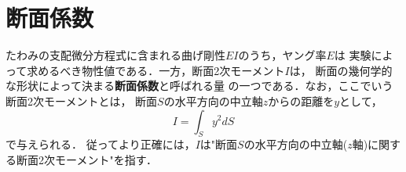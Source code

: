 ﻿\documentclass[10pt,a4j]{jbook}
\newlength{\minitwocolumn}
\begin{document}
\newcommand{\fat}[1]{\mbox{\boldmath $#1$}}
\newcommand{\D}{\partial}
\newcommand{\w}{\omega}
\newcommand{\ga}{\alpha}
\newcommand{\gb}{\beta}
\newcommand{\gx}{\xi}
\newcommand{\gz}{\zeta}
\newcommand{\vhat}[1]{\hat{\fat{#1}}}
\newcommand{\spc}{\vspace{0.7\baselineskip}}
\newcommand{\halfspc}{\vspace{0.3\baselineskip}}

\newcommand{\twofig}[2]
 {
   \begin{figure}
     \begin{minipage}[t]{\minitwocolumn}
         \begin{center}   #1
         \end{center}
     \end{minipage}
         \hspace{\columnsep}
     \begin{minipage}[t]{\minitwocolumn}
         \begin{center} #2
         \end{center}
     \end{minipage}
   \end{figure}
 }
\setcounter{chapter}{7}
\chapter{断面係数}
たわみの支配微分方程式に含まれる曲げ剛性$EI$のうち，ヤング率$E$は
実験によって求めるべき物性値である．一方，断面2次モーメント$I$は，
断面の幾何学的な形状によって決まる{\bf 断面係数}と呼ばれる量
の一つである．なお，ここでいう断面2次モーメントとは，
断面$S$の水平方向の中立軸$z$からの距離を$y$として，
\begin{equation}
	I=\int_S y^2 dS
	\label{eqn:Iz_xy}
\end{equation}
で与えられる．
従ってより正確には，$I$は"断面$S$の水平方向の中立軸($z$軸)に関する断面2次モーメント"を指す．
\end{document}
